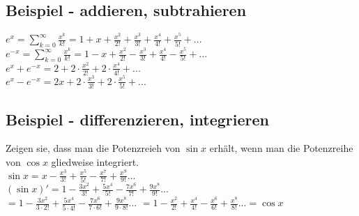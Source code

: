 \documentclass[../main.tex]{subfiles}
\begin{document}
\subsection{Beispiel - addieren, subtrahieren}
$e^x=\sum\limits_{k=0}^\infty\frac{x^k}{k!} = 1+x+\frac{x^2}{2!}+\frac{x^3}{3!}+\frac{x^4}{4!}+\frac{x^5}{5!}+...$ \\ [7pt]
$e^{-x}=\sum\limits_{k=0}^\infty\frac{x^k}{k!} = 1-x+\frac{x^2}{2!}-\frac{x^3}{3!}+\frac{x^4}{4!}-\frac{x^5}{5!}+...$ \\ [7pt]
$e^x+e^{-x}=2+2\cdot\frac{x^2}{2!}+2\cdot\frac{x^4}{4!}+...$ \\ [7pt]
$e^x-e^{-x}=2x+2\cdot\frac{x^3}{3!}+2\cdot\frac{x^5}{5!}+...$

\subsection{Beispiel - differenzieren, integrieren}
Zeigen sie, dass man die Potenzreieh von $\sin x$ erhält, wenn man die Potenzreihe von $\cos x$
gliedweise integriert. \\
$\sin x = x -\frac{x^3}{3!}+\frac{x^5}{5!}-\frac{x^7}{7!}+\frac{x^9}{9!}...$ \\ [7pt]
$(\sin x)'=1-\frac{3x^2}{3!}+\frac{5x^4}{5!}-\frac{7x^6}{7!}+\frac{9x^8}{9!}...$ \\ [7pt]
$=1-\frac{3x^2}{3\cdot 2!}+\frac{5x^4}{5\cdot 4!}-\frac{7x^6}{7\cdot 6!}+\frac{9x^8}{9\cdot 8!}...$
$=1-\frac{x^2}{2!}+\frac{x^4}{4!}-\frac{x^6}{6!}+\frac{x^8}{8!}... = \cos x$
\end{document}
